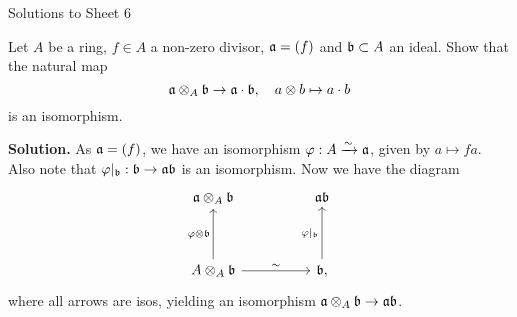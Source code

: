 \documentclass[a4paper,11pt]{article}
\begin{document}
\begin{center}
    \huge{Solutions to Sheet 6}
\end{center}

Let $A$ be a ring, $f \in A$ a non-zero divisor, $\mathfrak{a} = (f)$ and $\mathfrak{b} \subset A$
an ideal. Show that the natural map
\begin{equation*}
    \mathfrak{a} \otimes_A \mathfrak{b} \to \mathfrak{a} \cdot \mathfrak{b}, \quad a \otimes b \mapsto a\cdot b
\end{equation*}
is an isomorphism.


\textbf{Solution.} 
As $\mathfrak{a} = (f)$, we have an isomorphism $\varphi: A \xrightarrow{\sim} \mathfrak{a}$, given by 
$a \mapsto fa$. Also note that $\varphi|_{\mathfrak{b}}: \mathfrak{b} \to \mathfrak{a} \mathfrak{b}$ is an isomorphism.
Now we have the diagram
\[\begin{tikzcd}[ampersand replacement=\&]
	{\fa \otimes_A \fb} \&\& {\fa \fb} \\
	\\
	{A \otimes_A \fb} \&\& \fb
	\arrow["\sim", from=3-1, to=3-3]
	\arrow["{\phi|_\fb}", from=3-3, to=1-3]
	\arrow["{\phi \otimes \fb}", from=3-1, to=1-1],
\end{tikzcd}\]
where all arrows are isos, yielding an isomorphism $\mathfrak{a} \otimes_A \mathfrak{b} \to \mathfrak{a} \mathfrak{b}$. 
\end{document}
